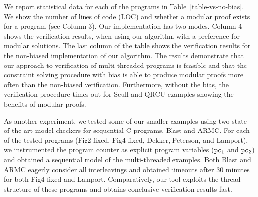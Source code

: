 We report statistical data for each of the programs in
Table~\ref{table-vs-no-bias}.
We show the number of lines of code (LOC) and whether a modular proof
exists for a program (see Column 3).
Our implementation has two modes. 
Column 4 shows the verification results, when using our algorithm with
a preference for modular solutions.
The last column of the table shows the verification results for the 
non-biased implementation of our algorithm.
The results demonstrate that our approach to verification of
multi-threaded programs is feasible and that the constraint solving
procedure with bias is able to produce modular proofs more
often than the non-biased verification.
Furthermore, without the bias, the verification procedure times-out
for Scull and QRCU examples showing the benefits of modular proofs.

As another experiment, we tested some of our smaller examples
using two state-of-the-art model checkers for sequential C programs,
Blast \cite{BlastLazy02} and ARMC\cite{RybalchenkoARMC}.
For each of the tested programs (Fig2-fixed, Fig4-fixed, Dekker,
Peterson, and Lamport), we instrumented the program counter as
explicit program variables ($\mathtt{pc_1}$ and $\mathtt{pc_2}$) and obtained a
sequential model of the multi-threaded examples.
Both Blast and ARMC eagerly consider all interleavings and obtained
timeouts after 30 minutes for both Fig4-fixed and Lamport.
Comparatively, our tool exploits the thread structure of these
programs and obtains conclusive verification results fast.


